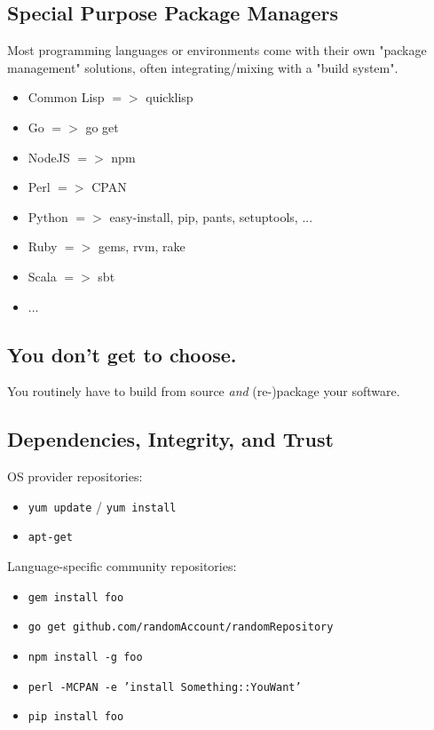 \documentclass[xga]{xdvislides}
\begin{document}
\subsection{Special Purpose Package Managers}
Most programming languages or environments come with their own "package
management" solutions, often integrating/mixing with a "build system".
\begin{itemize}
	\item Common Lisp $=>$ quicklisp
	\item Go $=>$ go get
	\item NodeJS $=>$ npm
	\item Perl $=>$ CPAN
	\item Python $=>$ easy-install, pip, pants, setuptools, ...
	\item Ruby $=>$ gems, rvm, rake
	\item Scala $=>$ sbt
	\item ...
\end{itemize}

\subsection{You don't get to choose.}
\Huge
\vfill
\begin{center}
	You routinely have to build from source {\em and} (re-)package your software.
\end{center}
\vfill
\Normalsize

\subsection{Dependencies, Integrity, and Trust}
OS provider repositories:
\begin{itemize}
	\item {\tt yum update} / {\tt yum install}
	\item {\tt apt-get}
\end{itemize}
\vspace{.5in}
Language-specific community repositories:
\begin{itemize}
	\item {\tt gem install foo}
	\item {\tt go get github.com/randomAccount/randomRepository}
	\item {\tt npm install -g foo}
	\item {\tt perl -MCPAN -e 'install Something::YouWant'}
	\item {\tt pip install foo}
\end{itemize}
\vspace{.5in}
\end{document}
